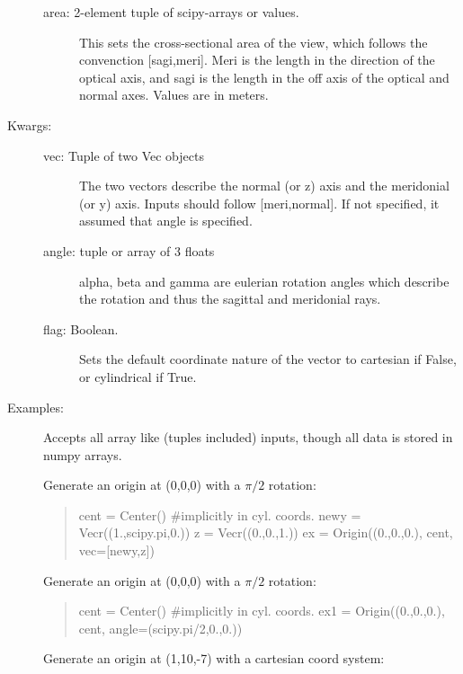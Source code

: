 \documentclass[letterpaper,10pt,english]{sphinxmanual}
\begin{document}
\begin{fulllineitems}
\begin{description}
\begin{description}
\item[{area: 2-element tuple of scipy-arrays or values.}] \leavevmode
This sets the cross-sectional area of the view, which
follows the convenction {[}sagi,meri{]}. Meri is the length
in the direction of the optical axis, and sagi is the 
length in the off axis of the optical and normal axes.
Values are in meters.

\end{description}

\item[{Kwargs:}] \leavevmode\begin{description}
\item[{vec: Tuple of two Vec objects}] \leavevmode
The two vectors describe the normal (or z) axis and
the meridonial (or y) axis. Inputs should follow
{[}meri,normal{]}. If not specified, it assumed that angle
is specified.

\item[{angle: tuple or array of 3 floats}] \leavevmode
alpha, beta and gamma are eulerian rotation angles which
describe the rotation and thus the sagittal and 
meridonial rays.

\item[{flag: Boolean.}] \leavevmode
Sets the default coordinate nature of the vector to 
cartesian if False, or cylindrical if True.

\end{description}

\item[{Examples:   }] \leavevmode
Accepts all array like (tuples included) inputs, though all data 
is stored in numpy arrays.

Generate an origin at (0,0,0) with a $\pi/2$ rotation:
\begin{quote}

cent = Center() \#implicitly in cyl. coords.
newy = Vecr((1.,scipy.pi,0.))
z = Vecr((0.,0.,1.))
ex = Origin((0.,0.,0.), cent, vec={[}newy,z{]})
\end{quote}

Generate an origin at (0,0,0) with a $\pi/2$ rotation:
\begin{quote}

cent = Center() \#implicitly in cyl. coords.
ex1 = Origin((0.,0.,0.), cent, angle=(scipy.pi/2,0.,0.))
\end{quote}

Generate an origin at (1,10,-7) with a cartesian coord system:
\begin{quote}


\end{quote}
\end{description}
\end{fulllineitems}
\end{document}
